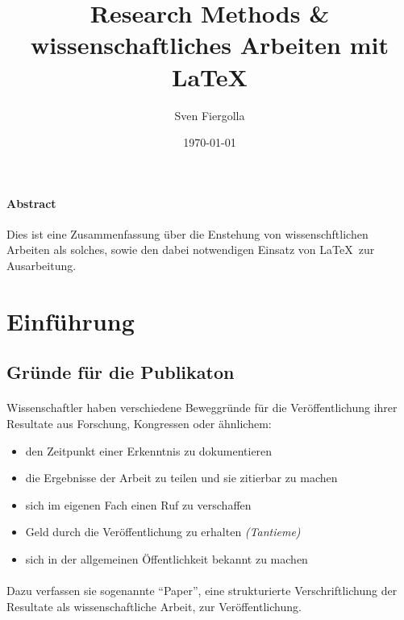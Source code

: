 \documentclass[10pt, a4paper]{article}
\author{Sven Fiergolla}
\title{Research Methods \& wissenschaftliches Arbeiten mit \LaTeX}
\date{\today}
\begin{document}
\maketitle

\paragraph{Abstract}
Dies ist eine Zusammenfassung über die Enstehung von wissenschftlichen Arbeiten als solches, sowie den dabei notwendigen Einsatz von \LaTeX\  zur Ausarbeitung.
\par
\tableofcontents
\bigskip

\section{Einführung}
\subsection{Gründe für die Publikaton}
\paragraph{}
Wissenschaftler haben verschiedene Beweggründe für die Veröffentlichung ihrer Resultate aus Forschung, Kongressen oder ähnlichem:
\par
\begin{itemize}
\item den Zeitpunkt einer Erkenntnis zu dokumentieren
\item die Ergebnisse der Arbeit zu teilen und sie zitierbar zu machen
\item sich im eigenen Fach einen Ruf zu verschaffen
\item Geld durch die Veröffentlichung zu erhalten \textit{(Tantieme)}
\item sich in der allgemeinen Öffentlichkeit bekannt zu machen
\end{itemize}
\par
\paragraph{}
Dazu verfassen sie sogenannte \enquote{Paper}, eine strukturierte Verschriftlichung der Resultate als wissenschaftliche Arbeit, zur Veröffentlichung.
\par
\end{document}
